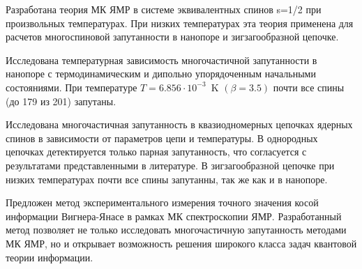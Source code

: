 \item 
Разработана теория МК ЯМР в системе эквивалентных спинов s=1/2 при произвольных температурах. При низких температурах эта теория применена для расчетов многоспиновой запутанности в
нанопоре и зигзагообразной цепочке.

\item 
Исследована температурная зависимость многочастичной запутанности в нанопоре с термодинамическим и дипольно упорядоченным начальными состояниями. 
При температуре 
$T = 6.856\cdot10^{-3}$~K $(\beta=3.5)$
почти все спины (до 179 из 201) запутаны.
 
\item 
Исследована многочастичная запутанность в квазиодномерных цепочках ядерных спинов в зависимости от параметров цепи и температуры. 
В однородных цепочках детектируется только парная запутанность, что согласуется с результатами представленными в литературе. 
В зигзагообразной цепочке при низких температурах почти все спины запутанны, так же как и в нанопоре.

\item 
Предложен метод экспериментального измерения точного значения косой информации Вигнера-Янасе в рамках МК спектроскопии ЯМР.
Разработанный метод позволяет не только исследовать многочастичную запутанность методами МК ЯМР, 
но и открывает возможность решения широкого класса задач квантовой теории информации. 